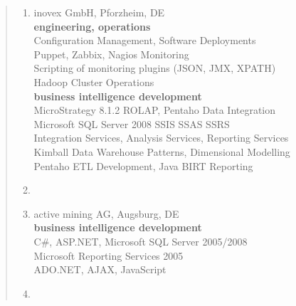 \documentclass[a4paper]{report}
\begin{document}
\begin{quote}
\begin{enumerate}

\item[2008 - current]
                    inovex GmbH, Pforzheim, DE\\
                    \textbf{engineering, operations}\\
                    Configuration Management, Software Deployments\\
                    Puppet, Zabbix, Nagios Monitoring\\
                    Scripting of monitoring plugins (JSON, JMX, XPATH)\\
                    Hadoop Cluster Operations\\
                    \textbf{business intelligence development}\\
                    MicroStrategy 8.1.2 ROLAP, Pentaho Data Integration\\
                    Microsoft SQL Server 2008 SSIS SSAS SSRS\\
                    Integration Services, Analysis Services, Reporting Services\\
                    Kimball Data Warehouse Patterns, Dimensional Modelling\\
                    Pentaho ETL Development, Java BIRT Reporting

\item[ ]

\item[2008]         active mining AG, Augsburg, DE\\
                    \textbf{business intelligence development}\\
                    C\#, ASP.NET, Microsoft SQL Server 2005/2008\\
                    Microsoft Reporting Services 2005\\
                    ADO.NET, AJAX, JavaScript

\item[ ]


\end{enumerate}
\end{quote}
\end{document}
